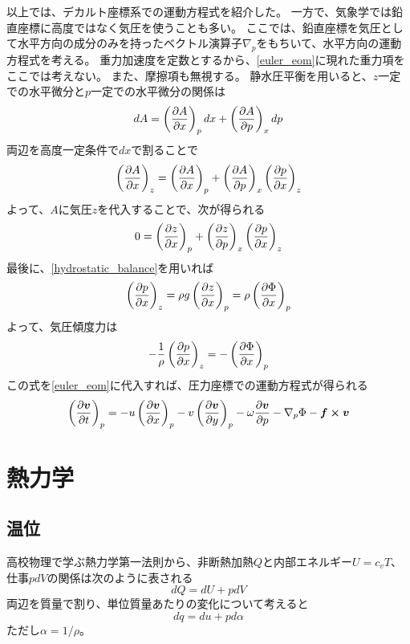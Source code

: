 \documentclass[a4paper,11pt,platex]{jsarticle}
\numberwithin{equation}{section}
\newcommand{\spartial}[2]{{\partial #1 \over \partial #2}}
\begin{document}
以上では、デカルト座標系での運動方程式を紹介した。
一方で、気象学では鉛直座標に高度ではなく気圧を使うことも多い。
ここでは、鉛直座標を気圧として水平方向の成分のみを持ったベクトル演算子$\nabla_p$をもちいて、水平方向の運動方程式を考える。
重力加速度を定数とするから、\autoref{euler_eom}に現れた重力項をここでは考えない。
また、摩擦項も無視する。
静水圧平衡を用いると、$z$一定での水平微分と$p$一定での水平微分の関係は
\begin{equation}
    dA = \left(\spartial{A}{x}\right)_p dx + \left(\spartial{A}{p}\right)_x dp
\end{equation}
両辺を高度一定条件で$dx$で割ることで
\begin{equation}
    \label{A_z_p_conversion}
    \left(\spartial{A}{x}\right)_z = \left(\spartial{A}{x}\right)_p + \left(\spartial{A}{p}\right)_x \left(\spartial{p}{x}\right)_z
\end{equation}
よって、$A$に気圧$z$を代入することで、次が得られる
\begin{equation}
    0 = \left(\spartial{z}{x}\right)_p + \left(\spartial{z}{p}\right)_x \left(\spartial{p}{x}\right)_z
\end{equation}
最後に、\autoref{hydrostatic_balance}を用いれば
\begin{equation}
    \left(\spartial{p}{x}\right)_z = \rho g \left(\spartial{z}{x}\right)_p = \rho \left(\spartial{\Phi}{x}\right)_p
\end{equation}
よって、気圧傾度力は
\begin{equation}
    -{1 \over \rho}\left(\spartial{p}{x}\right)_z = -\left(\spartial{\Phi}{x}\right)_p
\end{equation}
この式を\autoref{euler_eom}に代入すれば、圧力座標での運動方程式が得られる
\begin{equation}
    \left(\spartial{\vb*{v}}{t}\right)_p = -u\left(\spartial{\vb*{v}}{x}\right)_p - v\left(\spartial{\vb*{v}}{y}\right)_p - \omega\spartial{\vb*{v}}{p} - \nabla_p \Phi- \vb*{f} \cross \vb*{v}
\end{equation}


\section{熱力学}


\subsection{温位}
高校物理で学ぶ熱力学第一法則から、非断熱加熱$Q$と内部エネルギー$U=c_vT$、仕事$pdV$の関係は次のように表される
\begin{equation}
    dQ = dU + p dV
\end{equation}
両辺を質量で割り、単位質量あたりの変化について考えると
\begin{equation}
    \label{thermal_first_law}
    dq = du + pd\alpha
\end{equation}
ただし$\alpha=1/\rho$。
\end{document}
